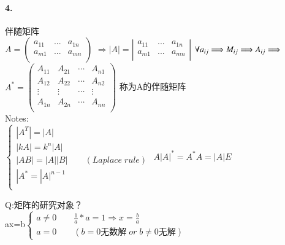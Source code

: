 \documentclass[printbox]{BHCexam}
\begin{document}
   \paragraph{4.}伴随矩阵\\
   $A=\left(                 %
   \begin{array}{ccc}   %
     a_{11} & ... & a_{1n}\\  %
     a_{m1} & ... & a_{mn}\\ 
   \end{array}
 \right)$                 %
 $ \Longrightarrow  
|A|=\left|                 %
\begin{array}{ccc}   %
  a_{11} & ... & a_{1n}\\  %
  a_{m1} & ... & a_{mn}\\ 
\end{array}
\right|$     
$ \forall a_{ij} \Longrightarrow M_{ij} \Longrightarrow A_{ij} \\
\Longrightarrow $
$A^*=\left(                 %
\begin{array}{cccc}   %
  A_{11} & A_{21} & \cdots & A_{n1}\\  %
  A_{12} & A_{22} & \cdots & A_{n2}\\  %
  \vdots & \vdots  & \cdots & \vdots \\  %
  A_{1n} & A_{2n} & \cdots & A_{nn}\\ 
\end{array}
\right)$ 称为A的伴随矩阵\\

Notes:\\
$\begin{cases}
  |A^T|=|A| \\
  |kA|=k^n|A|\\
  |AB|=|A||B|\qquad(Laplace\;rule)\\
  |A^*=|A|^{n-1}\\
\end{cases}$
$A|A|^*=A^*A=|A|E$

Q:矩阵的研究对象？\\
ax=b\qquad $\begin{cases}
  a \neq 0  \qquad \frac{1}{a} * a =1 \Longrightarrow x = \frac{b}{a} \\
  a = 0 \qquad (b =0 \text{无数解} \; or \; b \neq 0 \text{无解})
\end{cases}$
 
\end{document}
